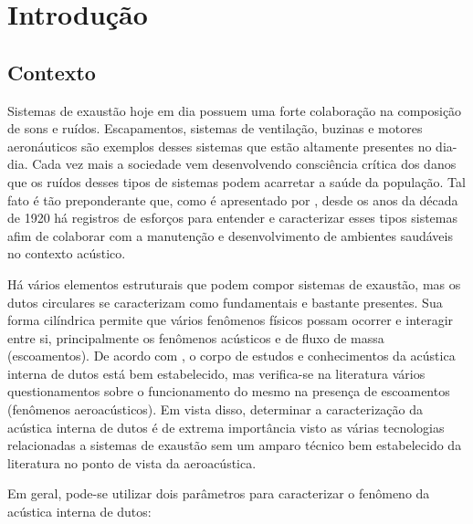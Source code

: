 \chapter{Introdução}
\label{chapter:introdcao}

\section{Contexto}

Sistemas de exaustão hoje em dia possuem uma forte colaboração na composição de sons e ruídos. Escapamentos, sistemas de ventilação, buzinas e motores aeronáuticos são exemplos desses sistemas que estão altamente presentes no dia-dia. Cada vez mais a sociedade vem desenvolvendo consciência crítica dos danos que os ruídos desses tipos de sistemas podem acarretar a saúde da população. Tal fato é tão preponderante que, como é apresentado por , desde os anos da década de 1920 há registros de esforços para entender e caracterizar esses tipos sistemas afim de colaborar com a manutenção e desenvolvimento de ambientes saudáveis no contexto acústico.

Há vários elementos estruturais que podem compor sistemas de exaustão, mas os dutos circulares se caracterizam como fundamentais e bastante presentes. Sua forma cilíndrica permite que vários fenômenos físicos possam ocorrer e interagir entre si, principalmente os fenômenos acústicos e de fluxo de massa (escoamentos). De acordo com , o corpo de estudos e conhecimentos da acústica interna de dutos está bem estabelecido, mas verifica-se na literatura vários questionamentos sobre o funcionamento do mesmo na presença de escoamentos (fenômenos aeroacústicos). Em vista disso, determinar a caracterização da acústica interna de dutos é de extrema importância visto as várias tecnologias relacionadas a sistemas de exaustão sem um amparo técnico bem estabelecido da literatura no ponto de vista da aeroacústica.

Em geral, pode-se utilizar dois parâmetros para caracterizar o fenômeno da acústica interna de dutos:

